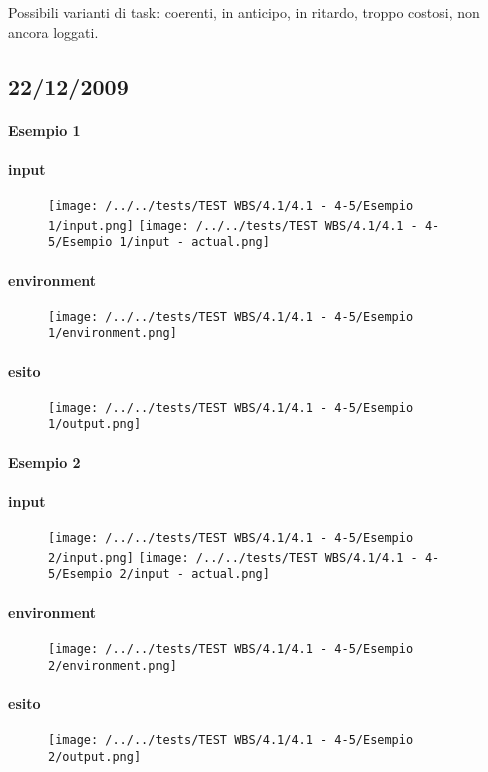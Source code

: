 Possibili varianti di task: coerenti, in anticipo, in ritardo, troppo costosi, non ancora loggati.

\subsection{22/12/2009}
\paragraph{Esempio 1}
\paragraph{input}
\begin{figure}
\centering
\texttt{[image: /../../tests/TEST WBS/4.1/4.1 - 4-5/Esempio 1/input.png]}
\texttt{[image: /../../tests/TEST WBS/4.1/4.1 - 4-5/Esempio 1/input - actual.png]}
\end{figure}
\paragraph{environment}
\begin{figure}
\centering
\texttt{[image: /../../tests/TEST WBS/4.1/4.1 - 4-5/Esempio 1/environment.png]}
\end{figure}
\paragraph{esito}
\begin{figure}
\centering
\texttt{[image: /../../tests/TEST WBS/4.1/4.1 - 4-5/Esempio 1/output.png]}
\end{figure}

\paragraph{Esempio 2}
\paragraph{input}
\begin{figure}
\centering
\texttt{[image: /../../tests/TEST WBS/4.1/4.1 - 4-5/Esempio 2/input.png]}
\texttt{[image: /../../tests/TEST WBS/4.1/4.1 - 4-5/Esempio 2/input - actual.png]}
\end{figure}
\paragraph{environment}
\begin{figure}
\centering
\texttt{[image: /../../tests/TEST WBS/4.1/4.1 - 4-5/Esempio 2/environment.png]}
\end{figure}
\paragraph{esito}
\begin{figure}
\centering
\texttt{[image: /../../tests/TEST WBS/4.1/4.1 - 4-5/Esempio 2/output.png]}
\end{figure}